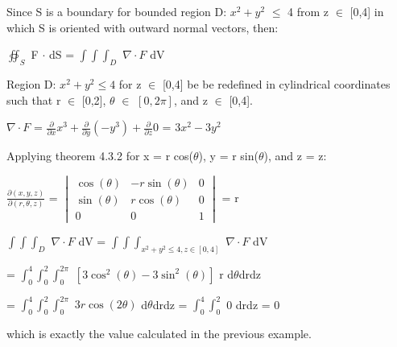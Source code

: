     \begin{tbox}
        Since S is a boundary for bounded region D:
        $x^2+y^2$ $\leq$ 4 from z $\in$ [0,4]
        in which S is oriented with outward normal vectors, then:

        \hspace{0.5cm}
        $\oiint_S$ F $\cdot$ dS
        = $\int \int \int_D$ $\nabla \cdot F$ dV
        
        Region D: $x^2 + y^2 \leq 4$ for z $\in$ [0,4] be
        be redefined in cylindrical coordinates such that
        r $\in$ [0,2], $\theta$ $\in$ $[0,2\pi]$, and z $\in$ [0,4].

        \hspace{0.5cm}
        $\nabla \cdot F$
        = $\frac{\partial}{\partial x}x^3
            + \frac{\partial}{\partial y}(-y^3)
            + \frac{\partial}{\partial z}0$
        = $3x^2 - 3y^2$
        
        Applying {\color{red} theorem 4.3.2}
        for x = r cos($\theta$), y = r sin($\theta$), and z = z:

        \hspace{0.5cm}
        $\frac{\partial(x,y,z)}{\partial(r,\theta,z)}$
        = $\begin{vmatrix}
            \cos(\theta) & -r \sin(\theta) & 0 \\
            \sin(\theta) & r \cos(\theta) & 0 \\
            0 & 0 & 1
        \end{vmatrix}$
        = r

        \hspace{0.5cm}
        $\int \int \int_D$ $\nabla \cdot F$ dV
        = $\int \int \int_{x^2 + y^2 \leq 4, z \in [0,4]}$ $\nabla \cdot F$ dV

        \hspace{3.6cm}
        = $\int_0^4 \int_0^2 \int_0^{2\pi}$
            $[3\cos^2(\theta) - 3\sin^2(\theta)]$ r d$\theta$drdz

        \hspace{3.6cm}
        = $\int_0^4 \int_0^2 \int_0^{2\pi}$ $3r \cos(2\theta)$ d$\theta$drdz
        = $\int_0^4 \int_0^2$ 0 drdz
        = 0

        which is exactly the value calculated in the previous example.
    \end{tbox}

    \vspace{0.5cm}






























